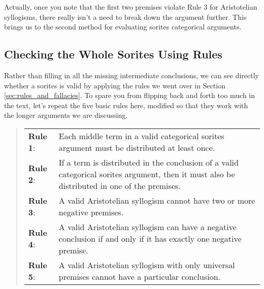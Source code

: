 \begin{center}
\end{center}

Actually, once you note that the first two premises violate Rule 3 for Aristotelian syllogisms, there really isn't a need to break down the argument further. This brings us to the second method for evaluating sorites categorical arguments.

\subsection{Checking the Whole Sorites Using Rules}

Rather than filling in all the missing intermediate conclusions, we can see directly whether a sorites is valid by applying the rules we went over in Section  \ref{sec:rules_and_fallacies}. To spare you from flipping back and forth too much in the text, let's repeat the five basic rules here, modified so that they work with the longer arguments we are discussing.

\begin{quotation}
\begin{tabu}{X[2] X[8]}
\textbf{Rule 1}: & Each middle term in a valid categorical sorites argument must be distributed at least once. \\
\textbf{Rule 2}: & If a term is distributed in the conclusion of a valid categorical sorites argument, then it must also be distributed in one of the premises. \\
\textbf{Rule 3}: & A valid Aristotelian syllogism cannot have two or more negative premises. \\
\textbf{Rule 4}: & A valid Aristotelian syllogism can have a negative conclusion if and only if it has exactly one negative premise.\\
\textbf{Rule 5}: & A valid Aristotelian syllogism with only universal premises cannot have a particular conclusion.
\end{tabu}
\end{quotation}

